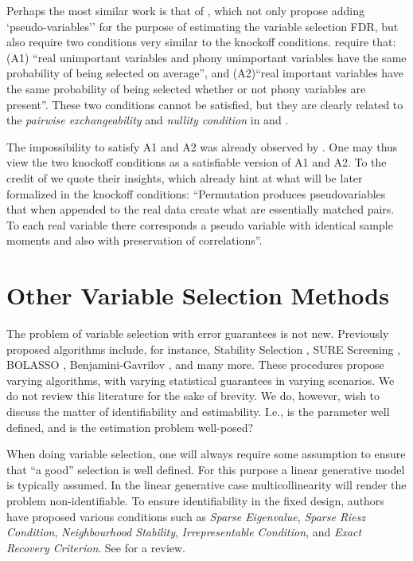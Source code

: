 \documentclass[article,lineno]{biometrika}
\begin{document}
Perhaps the most similar work is that of \cite{WuControllingVariableSelection2007}, which not only propose adding `pseudo-variables'' for the purpose of estimating the variable selection FDR, but also require two conditions very similar to the knockoff conditions. 
\cite{WuControllingVariableSelection2007} require that:
(A1) ``real unimportant variables and phony unimportant variables have the same probability of being selected on average'', and (A2)``real important variables have the same probability of being selected whether or not phony variables are present''.
These two conditions cannot be satisfied, but they are clearly related to the \emph{pairwise exchangeability} and \emph{nullity condition} in \cite{SesiaGenehuntinghidden} and \cite{CandesPanninggoldmodelX2018}.

The impossibility to satisfy A1 and A2 was already observed by \cite{WuControllingVariableSelection2007}. 
One may thus view the two knockoff conditions as a satisfiable version of A1 and A2.
To the credit of \cite{WuControllingVariableSelection2007} we quote their insights, which already hint at what will be later formalized in the knockoff conditions:
``Permutation produces pseudovariables that when appended to the real data create what
are essentially matched pairs. To each real variable there corresponds a pseudo variable with identical sample moments and also with preservation of correlations''.



\section{Other Variable Selection Methods}
The problem of variable selection with error guarantees is not new. 
Previously proposed algorithms include, for instance, Stability Selection \citep{MeinshausenStabilityselection2010}, SURE Screening \citep{fan2008sure}, BOLASSO \citep{bach2008bolasso}, Benjamini-Gavrilov \citep{Benjaminisimpleforwardselection2009}, and many more. 
These procedures propose varying algorithms, with varying statistical guarantees in varying scenarios. 
We do not review this literature for the sake of brevity. 
We do, however, wish to discuss the matter of identifiability and estimability. 
I.e., is the parameter well defined, and is the estimation problem well-posed? 

When doing variable selection, one will always require some assumption to ensure that ``a good'' selection is well defined. 
For this purpose a linear generative model is typically assumed. 
In the linear generative case multicollinearity will render the problem non-identifiable. 
To ensure identifiability in the fixed design, authors have proposed various conditions such as \emph{Sparse Eigenvalue}, \emph{Sparse Riesz Condition}, \emph{Neighbourhood Stability}, \emph{Irrepresentable Condition}, and \emph{Exact Recovery Criterion}. 
See \citet[Sec 3.1.1]{MeinshausenStabilityselection2010} for a review. 
\end{document}
